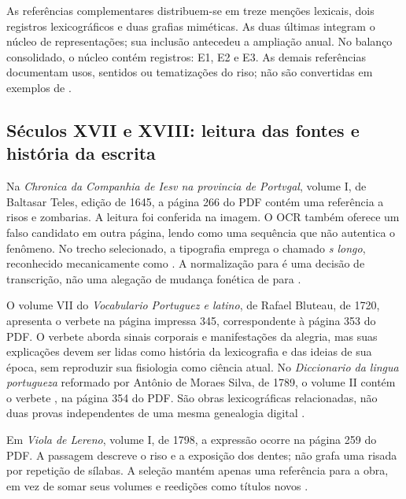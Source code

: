 As referências complementares distribuem-se em treze menções lexicais, dois registros lexicográficos e duas grafias miméticas. As duas últimas integram o núcleo de representações; sua inclusão antecedeu a ampliação anual. No balanço consolidado, o núcleo contém \CorpusSize{} registros: \CoreEOne{} E1, \CoreETwo{} E2 e \CoreEThree{} E3. As demais referências documentam usos, sentidos ou tematizações do riso; não são convertidas em exemplos de .

\subsection{Séculos XVII e XVIII: leitura das fontes e história da escrita}

Na \textit{Chronica da Companhia de Iesv na provincia de Portvgal}, volume I, de Baltasar Teles, edição de 1645, a página 266 do PDF contém uma referência a risos e zombarias. A leitura foi conferida na imagem. O OCR também oferece um falso candidato em outra página, lendo como  uma sequência que não autentica o fenômeno. No trecho selecionado, a tipografia emprega o chamado \emph{s longo}, reconhecido mecanicamente como . A normalização para  é uma decisão de transcrição, não uma alegação de mudança fonética de  para  \cite{r4chronicacompanhiaiesvportugal}.

O volume VII do \textit{Vocabulario Portuguez e latino}, de Rafael Bluteau, de 1720, apresenta o verbete  na página impressa 345, correspondente à página 353 do PDF. O verbete aborda sinais corporais e manifestações da alegria, mas suas explicações devem ser lidas como história da lexicografia e das ideias de sua época, sem reproduzir sua fisiologia como ciência atual. No \textit{Diccionario da lingua portugueza} reformado por Antônio de Moraes Silva, de 1789, o volume II contém o verbete , na página 354 do PDF. São obras lexicográficas relacionadas, não duas provas independentes de uma mesma genealogia digital \cite{r4vocabularioportuguezlatino,r4diccionariolinguaportuguezamorais}.

Em \textit{Viola de Lereno}, volume I, de 1798, a expressão  ocorre na página 259 do PDF. A passagem descreve o riso e a exposição dos dentes; não grafa uma risada por repetição de sílabas. A seleção mantém apenas uma referência para a obra, em vez de somar seus volumes e reedições como títulos novos \cite{r4violadelereno}.

